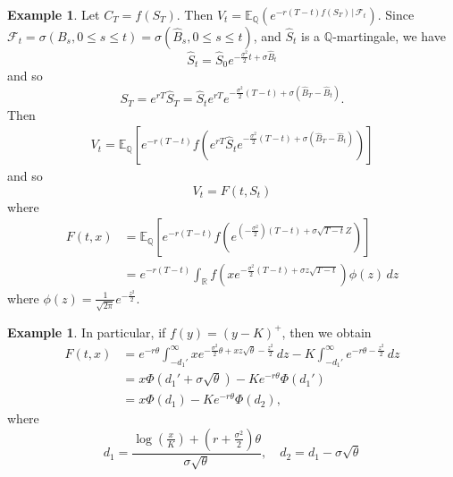 \documentclass[10pt, oneside, reqno]{amsart}
\theoremstyle{plain}%
\theoremstyle{definition}
\newtheorem{exmp}[thm]{Example}
\theoremstyle{remark}
\newcommand{\given}{ \, | \,}
\newcommand{\Q}{\mathbb{Q}}
\newcommand{\R}{\mathbb{R}}
\newcommand{\E}{\mathbb{E}}
\newcommand{\sigf}{\mathcal{F}}
\begin{document}
\begin{exmp}
	Let $C_T = f(S_T)$.  Then $V_t = \E_\Q \left( e^{-r(T- t) f(S_T) \given \sigf_t} \right)$.    Since $\sigf_t = \sigma(B_s, 0 \leq s \leq t) = \sigma(\hat B_s, 0 \leq s \leq t)$, and $\hat S_t$ is a $\Q$-martingale, we have \[
		\hat S_t = \hat S_0 e^{- \frac{\sigma^2}{2}t + \sigma \hat B_t}
	\] and so \[
		S_T =  e^{rT} \hat S_T = \hat S_t e^{rT} e^{- \frac{\sigma^2}{2}(T- t) + \sigma(\hat B_T - \hat B_t)}. 
	\]  Then \begin{align*}
		V_t = \E_\Q \left[ e^{-r(T-t)} f\left( e^{rT}\hat S_t e^{-\frac{\sigma^2}{2}(T-t) + \sigma( \hat B_T - \hat B_t)} \right) \right]
	\end{align*} and so \[
		V_t = F(t, S_t)
	\] where \begin{align*}
		F(t, x) &= \E_\Q\left[ e^{-r(T-t)} f\left(e^{(-\frac{\sigma^2}{2})(T-t) + \sigma \sqrt{T-t} Z} \right) \right]\\
				&= e^{-r(T-t)} \int_\R f\left(xe^{-\frac{\sigma^2}{2}(T-t) + \sigma z \sqrt{T-t}} \right) \phi(z) \, dz
	\end{align*}  where $\phi(z) = \frac{1}{\sqrt{2 \pi}} e^{- \frac{z^2}{2}}$.
\end{exmp}

\begin{exmp}
	In particular, if $f(y) = (y - K)^+$, then we obtain \begin{align*}
		F(t, x) &= e^{-r\theta} \int_{-d_1'}^\infty xe^{-\frac{\sigma^2}{2} \theta + xz \sqrt{\theta} - \frac{z^2}{2}} \, dz - K \int_{-d_1'}^\infty e^{-r\theta - \frac{z^2}{2}} \, dz \\
		&= x \Phi(d_1' + \sigma \sqrt{\theta}) - K e^{-r \theta} \Phi(d_1') \\
		&= x \Phi(d_1) - K e^{-r \theta} \Phi(d_2), 
	\end{align*} where \[
		d_1 = \frac{ \log \left( \frac{x}{K} \right) + (r + \frac{\sigma^2}{2}) \theta}{\sigma \sqrt{\theta}}, \quad d_2 = d_1 - \sigma \sqrt{\theta} 
	\]
\end{exmp} 
\end{document}
